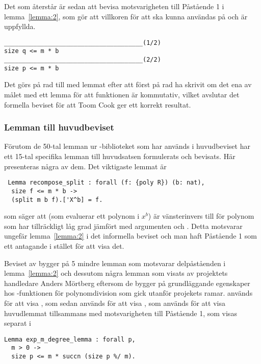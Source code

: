 Det som återstår är sedan att bevisa motsvarigheten till Påstående 1 i
lemma~\ref{lemma:2}, som gör att villkoren för att  ska
kunna användas på  och  är uppfyllda.
\begin{lstlisting}
______________________________________(1/2)
size q <= m * b
______________________________________(2/2)
size p <= m * b
\end{lstlisting}
Det görs på rad  till  med lemmat  efter att först
på rad  ha skrivit om det ena av målet med ett lemma för att funktionen
 är kommutativ, vilket avslutar det formella beviset för att Toom
Cook ger ett korrekt resultat.

\subsubsection{Lemman till huvudbeviset}
Förutom de 50-tal lemman ur \ssr-biblioteket som har används i huvudbeviset har
ett 15-tal specifika lemman till huvudsatsen formulerats och bevisats. Här
presenteras några av dem. Det viktigaste lemmat är
\begin{lstlisting}
 Lemma recompose_split : forall (f: {poly R}) (b: nat),
  size f <= m * b ->
  (split m b f).['X^b] = f.
\end{lstlisting}
som säger att  (som evaluerar ett polynom i $x^b$) är
vänsterinvers till  för polynom som har tillräckligt låg grad jämfört
med argumenten  och . Detta motsvarar ungefär lemma~\ref{lemma:2} i
det informella beviset och man haft Påstående 1 som ett antagande i stället för
att visa det.

Beviset av  bygger på 5 mindre lemman som motsvarar
delpåståenden i lemma~\ref{lemma:2} och dessutom några lemman som visats av
projektets handledare Anders Mörtberg eftersom de bygger på grundläggande
egenskaper hos \ssr-funktionen  för polynomdivision som gick utanför
projekets ramar.
 används för att visa , som
sedan används för att visa , som används för att visa
huvudlemmat tillsammans med motsvarigheten till Påstående 1, som visas separat
i
\begin{lstlisting}
Lemma exp_m_degree_lemma : forall p,
  m > 0 ->
  size p <= m * succn (size p %/ m).
\end{lstlisting}

